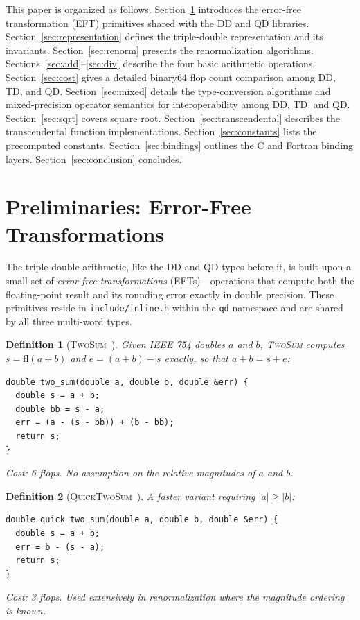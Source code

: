 \documentclass[11pt,a4paper]{article}
\newtheorem{definition}{Definition}
\begin{document}
This paper is organized as follows.  Section~\ref{sec:eft}
introduces the error-free transformation (EFT) primitives shared
with the DD and QD libraries.
Section~\ref{sec:representation}
defines the triple-double representation and its invariants.
Section~\ref{sec:renorm} presents the renormalization algorithms.
Sections~\ref{sec:add}--\ref{sec:div} describe the four basic
arithmetic operations.  Section~\ref{sec:cost} gives a detailed
binary64 flop count comparison among DD, TD, and QD.
Section~\ref{sec:mixed} details the
type-conversion algorithms and mixed-precision operator semantics
for interoperability among DD, TD, and QD.
Section~\ref{sec:sqrt} covers square root.
Section~\ref{sec:transcendental} describes the transcendental
function implementations.  Section~\ref{sec:constants} lists the
precomputed constants.  Section~\ref{sec:bindings} outlines the C
and Fortran binding layers.
Section~\ref{sec:conclusion} concludes.


\section{Preliminaries: Error-Free Transformations}
\label{sec:eft}

The triple-double arithmetic, like the DD and QD types before it,
is built upon a small set of \emph{error-free transformations}
(EFTs)---operations that compute both the floating-point result and
its rounding error exactly in double precision.  These primitives
reside in \texttt{include/inline.h} within the \texttt{qd} namespace
and are shared by all three multi-word types.

\begin{definition}[\textsc{TwoSum}~{\cite{Knuth1997,Dekker1971}}]
Given IEEE 754 doubles $a$ and $b$, \textsc{TwoSum} computes
$s = \mathrm{fl}(a + b)$ and $e = (a + b) - s$ exactly, so that
$a + b = s + e$:
\begin{lstlisting}
double two_sum(double a, double b, double &err) {
  double s = a + b;
  double bb = s - a;
  err = (a - (s - bb)) + (b - bb);
  return s;
}
\end{lstlisting}
Cost: 6 flops.  No assumption on the relative magnitudes of $a$
and $b$.
\end{definition}

\begin{definition}[\textsc{QuickTwoSum}~{\cite{Dekker1971}}]
A faster variant requiring $|a| \ge |b|$:
\begin{lstlisting}
double quick_two_sum(double a, double b, double &err) {
  double s = a + b;
  err = b - (s - a);
  return s;
}
\end{lstlisting}
Cost: 3 flops.  Used extensively in renormalization where the
magnitude ordering is known.
\end{definition}
\end{document}
